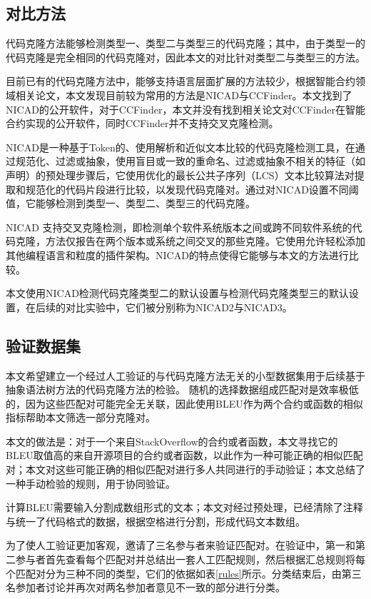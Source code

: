 \subsection{对比方法}
代码克隆方法能够检测类型一、类型二与类型三的代码克隆；其中，由于类型一的代码克隆是完全相同的代码克隆对，因此本文的对比针对类型二与类型三的方法。

目前已有的代码克隆方法中，能够支持语言层面扩展的方法较少，根据智能合约领域相关论文\cite{smartembed}\cite{clone_esystem}，本文发现目前较为常用的方法是NICAD\cite{nicad}与CCFinder\cite{clone4}。本文找到了NICAD的公开软件，对于CCFinder，本文并没有找到相关论文对CCFinder在智能合约实现的公开软件，同时CCFinder并不支持交叉克隆检测。

NICAD是一种基于Token的、使用解析和近似文本比较的代码克隆检测工具，在通过规范化、过滤或抽象，使用盲目或一致的重命名、过滤或抽象不相关的特征（如声明）的预处理步骤后，它使用优化的最长公共子序列（LCS）文本比较算法对提取和规范化的代码片段进行比较，以发现代码克隆对。通过对NICAD设置不同阈值，它能够检测到类型一、类型二、类型三的代码克隆。

NICAD 支持交叉克隆检测，即检测单个软件系统版本之间或跨不同软件系统的代码克隆，方法仅报告在两个版本或系统之间交叉的那些克隆。它使用允许轻松添加其他编程语言和粒度的插件架构。NICAD的特点使得它能够与本文的方法进行比较。

本文使用NICAD检测代码克隆类型二的默认设置与检测代码克隆类型三的默认设置，在后续的对比实验中，它们被分别称为NICAD2与NICAD3。

\subsection{验证数据集}

本文希望建立一个经过人工验证的与代码克隆方法无关的小型数据集用于后续基于抽象语法树方法的代码克隆方法的检验。
随机的选择数据组成匹配对是效率极低的，因为这些匹配对可能完全无关联，因此使用BLEU作为两个合约或函数的相似指标帮助本文筛选一部分克隆对。

本文的做法是：对于一个来自StackOverflow的合约或者函数，本文寻找它的BLEU取值高的来自开源项目的合约或者函数，以此作为一种可能正确的相似匹配对；本文对这些可能正确的相似匹配对进行多人共同进行的手动验证；本文总结了一种手动检验的规则，用于协同验证。

计算BLEU需要输入分割成数组形式的文本；本文对经过预处理，已经清除了注释与统一了代码格式的数据，根据空格进行分割，形成代码文本数组。

为了使人工验证更加客观，邀请了三名参与者来验证匹配对。在验证中，第一和第二参与者首先查看每个匹配对并总结出一套人工匹配规则，然后根据汇总规则将每个匹配对分为三种不同的类型，它们的依据如表\ref{rules}所示。分类结束后，由第三名参加者讨论并再次对两名参加者意见不一致的部分进行分类。

